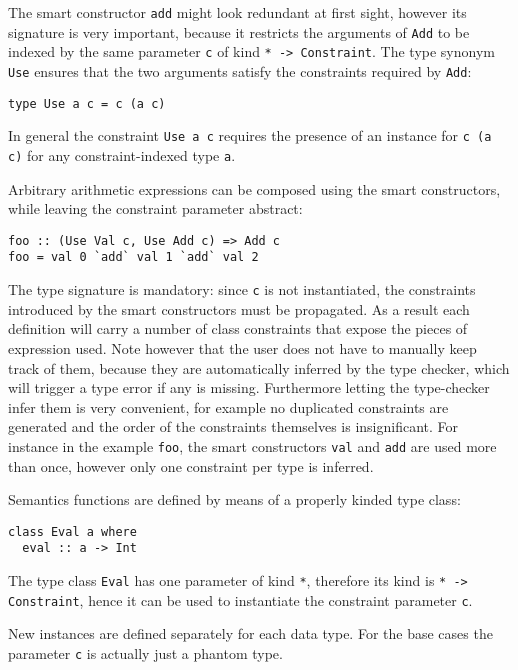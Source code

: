 \documentclass[../Thesis.tex]{subfiles}
\begin{document}
The smart constructor \texttt{add} might look redundant at first sight, 
however its signature is very important, because it restricts the arguments of 
\texttt{Add} to be indexed by the same parameter \texttt{c} of kind \texttt{* -> Constraint}.
The type synonym \texttt{Use} ensures that the two arguments
satisfy the constraints required by \texttt{Add}:
\begin{verbatim}
type Use a c = c (a c)
\end{verbatim}

In general the constraint \texttt{Use a c} requires the presence of an instance for \texttt{c (a c)} for any constraint-indexed type \texttt{a}.

Arbitrary arithmetic expressions can be composed using the smart constructors, while leaving the constraint parameter abstract:
\begin{verbatim}
foo :: (Use Val c, Use Add c) => Add c
foo = val 0 `add` val 1 `add` val 2
\end{verbatim}

The type signature is mandatory: since \texttt{c} is not instantiated, the 
constraints introduced by the smart constructors must be propagated. As a result each definition will carry a number of class constraints that expose the pieces of expression used.
Note however that the user does not have to manually keep track of them, because they are automatically inferred by the type checker, which
will trigger a type error if any is missing. Furthermore letting the type-checker infer them is very convenient, for example no duplicated constraints are generated and the order of the constraints themselves is insignificant.
For instance in the example \texttt{foo}, the smart constructors \texttt{val} and \texttt{add} are used more than once, however only one constraint per type is inferred. 

Semantics functions are defined by means of a properly kinded type class:

\begin{verbatim}
class Eval a where
  eval :: a -> Int
\end{verbatim}

The type class \texttt{Eval} has one parameter of kind \texttt{*}, therefore
its kind is \texttt{* -> Constraint}, hence
it can be used to instantiate the constraint parameter \texttt{c}.

New instances are defined separately for each data type. For the base cases the parameter \texttt{c} is actually just a phantom type.
\end{document}
